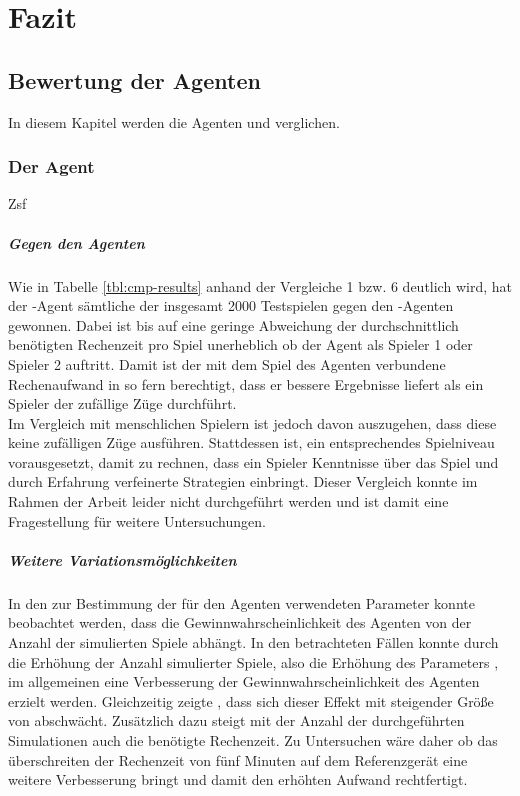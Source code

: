 \chapter{Fazit}

\section{Bewertung der Agenten}
In diesem Kapitel werden die Agenten  und  verglichen.
\subsection{Der Agent }
Zsf 
\paragraph{Gegen den Agenten }
Wie in Tabelle \ref{tbl:cmp-results} anhand der Vergleiche 1 bzw. 6 deutlich wird, hat der -Agent sämtliche der insgesamt 2000 Testspielen gegen den -Agenten gewonnen. Dabei ist bis auf eine geringe Abweichung der durchschnittlich benötigten Rechenzeit pro Spiel unerheblich ob der Agent als Spieler 1 oder Spieler 2 auftritt. Damit ist der mit dem Spiel des Agenten verbundene Rechenaufwand in so fern berechtigt, dass er bessere Ergebnisse liefert als ein Spieler der zufällige Züge durchführt.
\\Im Vergleich mit menschlichen Spielern ist jedoch davon auszugehen, dass diese keine zufälligen Züge ausführen. Stattdessen ist, ein entsprechendes Spielniveau vorausgesetzt, damit zu rechnen, dass ein Spieler Kenntnisse über das Spiel und durch Erfahrung verfeinerte Strategien einbringt. Dieser Vergleich konnte im Rahmen der Arbeit leider nicht durchgeführt werden und ist damit eine Fragestellung für weitere Untersuchungen.  
\paragraph{Weitere Variationsmöglichkeiten}
In den zur Bestimmung der für den Agenten verwendeten Parameter konnte beobachtet werden, dass die Gewinnwahrscheinlichkeit des Agenten von der Anzahl der simulierten Spiele abhängt. In den betrachteten Fällen konnte durch die Erhöhung der Anzahl simulierter Spiele, also die Erhöhung des Parameters , im allgemeinen eine Verbesserung der Gewinnwahrscheinlichkeit des Agenten erzielt werden. Gleichzeitig zeigte \cite{nijssen_2007}, dass sich dieser Effekt mit steigender Größe von  abschwächt. Zusätzlich dazu steigt mit der Anzahl der durchgeführten Simulationen auch die benötigte Rechenzeit. Zu Untersuchen wäre daher ob das überschreiten der Rechenzeit von fünf Minuten auf dem Referenzgerät eine weitere Verbesserung bringt und damit den erhöhten Aufwand rechtfertigt.

